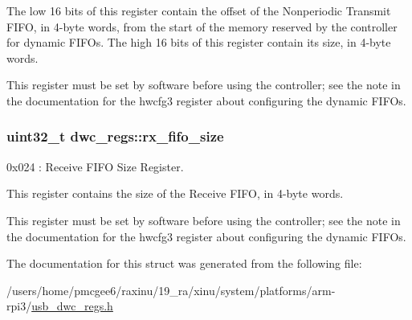 The low 16 bits of this register contain the offset of the Nonperiodic Transmit F\-I\-F\-O, in 4-\/byte words, from the start of the memory reserved by the controller for dynamic F\-I\-F\-Os. The high 16 bits of this register contain its size, in 4-\/byte words.

This register must be set by software before using the controller; see the note in the documentation for the hwcfg3 register about configuring the dynamic F\-I\-F\-Os. \hypertarget{structdwc__regs_a59bf777de1765b60e3d6a4b68b1cf1f4}{
\subsubsection[{rx\-\_\-fifo\-\_\-size}]{\setlength{\rightskip}{0pt plus 5cm}uint32\-\_\-t dwc\-\_\-regs\-::rx\-\_\-fifo\-\_\-size}}\label{structdwc__regs_a59bf777de1765b60e3d6a4b68b1cf1f4}
0x024 \-: Receive F\-I\-F\-O Size Register.

This register contains the size of the Receive F\-I\-F\-O, in 4-\/byte words.

This register must be set by software before using the controller; see the note in the documentation for the hwcfg3 register about configuring the dynamic F\-I\-F\-Os. 

The documentation for this struct was generated from the following file\-:\begin{DoxyCompactItemize}
\item 
/users/home/pmcgee6/raxinu/19\-\_\-ra/xinu/system/platforms/arm-\/rpi3/\hyperlink{usb__dwc__regs_8h}{usb\-\_\-dwc\-\_\-regs.\-h}\end{DoxyCompactItemize}
